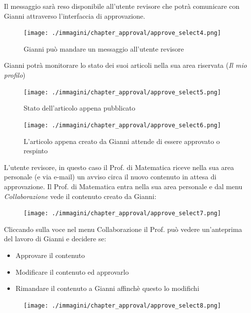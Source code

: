 Il messaggio sarà reso disponibile all'utente revisore che potrà comunicare con Gianni attraverso l'interfaccia di approvazione.

\begin{figure}[H]
 \centering
 \texttt{[image: ./immagini/chapter\_approval/approve\_select4.png]}
\caption{Gianni può mandare un messaggio all'utente revisore}
\label{fig:approve_select4}
\end{figure}

Gianni potrà monitorare lo stato dei suoi articoli nella sua area riservata (\textsl{Il mio profilo}) 

\begin{figure}[H]
 \centering
 \texttt{[image: ./immagini/chapter\_approval/approve\_select5.png]}
\caption{Stato dell'articolo appena pubblicato} 
\label{fig:approve_select5}
\end{figure}

\begin{figure}[H]
 \centering
 \texttt{[image: ./immagini/chapter\_approval/approve\_select6.png]}
\caption{L'articolo appena creato da Gianni attende di essere approvato o respinto} 
\label{fig:approve_select6}
\end{figure}

L'utente revisore, in questo caso il Prof. di Matematica riceve nella sua area personale (e via e-mail) un avviso circa il nuovo contenuto in attesa di approvazione. Il Prof. di Matematica entra nella sua area personale e dal menu \textsl{Collaborazione} vede il contenuto creato da Gianni:

\begin{figure}[H]
 \centering
 \texttt{[image: ./immagini/chapter\_approval/approve\_select7.png]}
 \label{fig:approve_select7}
\end{figure}

Cliccando sulla voce nel menu Collaborazione il Prof. può vedere un'anteprima del lavoro di Gianni e decidere se:
\begin{itemize}
 \item Approvare il contenuto
\item Modificare il contenuto ed approvarlo
\item Rimandare il contenuto a Gianni affinchè questo lo modifichi
\end{itemize}
\begin{figure}[H]
 \centering
 \texttt{[image: ./immagini/chapter\_approval/approve\_select8.png]}
 \label{fig:approve_select8}
\end{figure}

